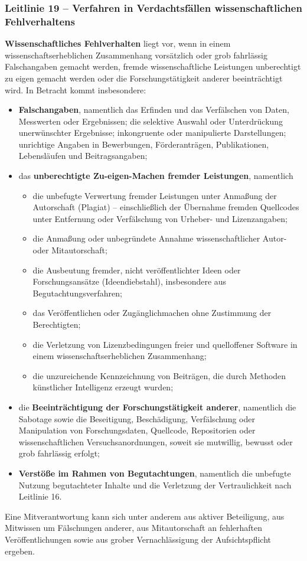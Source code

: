 \documentclass[a4paper, fontsize=11pt]{scrartcl}
\begin{document}
\subsubsection*{Leitlinie 19 -- Verfahren in Verdachtsfällen wissenschaftlichen Fehlverhaltens}
\textbf{Wissenschaftliches Fehlverhalten} liegt vor, wenn in einem wissenschaftserheblichen Zusammenhang vorsätzlich oder grob fahrlässig Falschangaben gemacht werden, fremde wissenschaftliche Leistungen unberechtigt zu eigen gemacht werden oder die Forschungstätigkeit anderer beeinträchtigt wird. In Betracht kommt insbesondere:
\begin{itemize}
  \item \textbf{Falschangaben}, namentlich das Erfinden und das Verfälschen von Daten, Messwerten oder Ergebnissen; die selektive Auswahl oder Unterdrückung unerwünschter Ergebnisse; inkongruente oder manipulierte Darstellungen; unrichtige Angaben in Bewerbungen, Förderanträgen, Publikationen, Lebensläufen und Beitragsangaben;
  \item das \textbf{unberechtigte Zu-eigen-Machen fremder Leistungen}, namentlich
  \begin{itemize}
    \item die unbefugte Verwertung fremder Leistungen unter Anmaßung der Autorschaft (Plagiat) -- einschließlich der Übernahme fremden Quellcodes unter Entfernung oder Verfälschung von Urheber- und Lizenzangaben;
    \item die Anmaßung oder unbegründete Annahme wissenschaftlicher Autor- oder Mitautorschaft;
    \item die Ausbeutung fremder, nicht veröffentlichter Ideen oder Forschungsansätze (Ideendiebstahl), insbesondere aus Begutachtungsverfahren;
    \item das Veröffentlichen oder Zugänglichmachen ohne Zustimmung der Berechtigten;
    \item die Verletzung von Lizenzbedingungen freier und quelloffener Software in einem wissenschaftserheblichen Zusammenhang;
    \item die unzureichende Kennzeichnung von Beiträgen, die durch Methoden künstlicher Intelligenz erzeugt wurden;
  \end{itemize}
  \item die \textbf{Beeinträchtigung der Forschungstätigkeit anderer}, namentlich die Sabotage sowie die Beseitigung, Beschädigung, Verfälschung oder Manipulation von Forschungsdaten, Quellcode, Repositorien oder wissenschaftlichen Versuchsanordnungen, soweit sie mutwillig, bewusst oder grob fahrlässig erfolgt;
  \item \textbf{Verstöße im Rahmen von Begutachtungen}, namentlich die unbefugte Nutzung begutachteter Inhalte und die Verletzung der Vertraulichkeit nach Leitlinie 16.
\end{itemize}
Eine Mitverantwortung kann sich unter anderem aus aktiver Beteiligung, aus Mitwissen um Fälschungen anderer, aus Mitautorschaft an fehlerhaften Veröffentlichungen sowie aus grober Vernachlässigung der Aufsichtspflicht ergeben.
\end{document}
